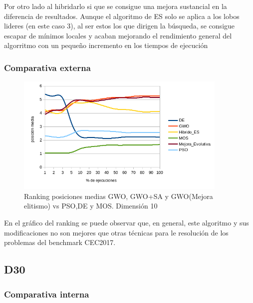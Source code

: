 \documentclass[a4paper]{report}
\begin{document}
Por otro lado al hibridarlo si que se consigue una mejora sustancial en la diferencia de resultados. Aunque el algoritmo de ES solo se aplica a los lobos lideres (en este caso 3), al ser estos los que dirigen la búsqueda, se consigue escapar de mínimos locales y acaban mejorando el rendimiento general del algorritmo con un pequeño incremento en los tiempos de ejecución




\subsubsection{Comparativa externa}






\begin{figure}[H]
    \centering
    \caption{Ranking posiciones medias GWO, GWO+SA y GWO(Mejora elitismo) vs PSO,DE y MOS. Dimensión 10}
    \includegraphics[width=0.9\textwidth]{Resultados/Analisis_final/D10/Todos/Grafico_puestos.png}

\end{figure}


En el gráfico del ranking se puede observar que, en general, este algoritmo y sus modificaciones no son mejores que otras técnicas para le resolución de los problemas del benchmark CEC2017.

\subsection{D30}


\subsubsection{Comparativa interna}
\end{document}

